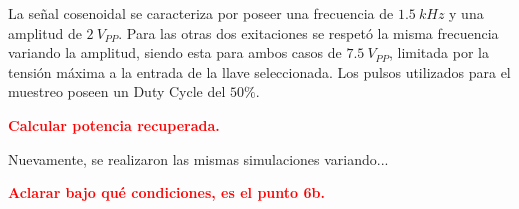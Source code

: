
La señal cosenoidal se caracteriza por poseer una frecuencia de $1.5 \ kHz$ y una amplitud de $2 \ V_{PP}$. Para las otras dos exitaciones se respetó la misma frecuencia variando la amplitud, siendo esta para ambos casos de $7.5 \ V_{PP}$, limitada por la tensión máxima a la entrada de la llave seleccionada. Los pulsos utilizados para el muestreo poseen un Duty Cycle del $50 \%$.

\textcolor{red}{\textbf{Calcular potencia recuperada.}}

Nuevamente, se realizaron las mismas simulaciones variando...

\textcolor{red}{\textbf{Aclarar bajo qué condiciones, es el punto 6b.}}

